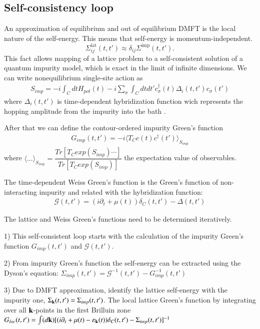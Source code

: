 \subsection{Self-consistency loop}
An approximation of equilibrium and out of equilibrium DMFT is the local nature of the self-energy. This means that self-energy is momentum-independent.
\begin{equation}
\Sigma_{ij}^\text{lat}(t,t')\approx \delta_{ij}\Sigma^\text{imp}(t,t').
\end{equation}
This fact allows mapping of a lattice problem to a self-consistent solution of a quantum impurity model, which is exact in the limit of infinite dimensions. 
We can write nonequilibrium single-site action as
\begin{align}
\label{Action}
S_{imp}=-i\int_C dt H_{pot}(t)-i\sum_{\sigma}{\int_C dt dt' c^{\dagger}_{\sigma}(t) \Delta_i (t,t') c_{\sigma}(t')}
\end{align}
where $\Delta_i (t,t')$ is time-dependent hybridization function wich represents the hopping amplitude from the impurity into the bath \citep{PhysRevB.45.6479}.

After that we can define the contour-ordered impurity Green’s function
\begin{align}
\label{Green_imp}
G_{imp}(t,t')=-i\langle T_C c(t) c^{\dagger}(t') \rangle_{S_{imp}}
\end{align}
where $\langle...\rangle_{S_{imp}}=\dfrac{Tr\left[T_C exp (S_{imp})\cdots\right] }{Tr \left[T_C exp (S_{imp})\right]}$ the expectation value of observables.

The time-dependent Weiss Green's function is the Green's function of non-interacting impurity and related with the hybridization function:
\begin{align}
\label{Green_Weiss}
\mathcal{G}(t,t')=(i\partial_t+\mu(t))\delta_C(t,t')-\Delta(t,t')
\end{align}

The lattice and Weiss Green's functions need to be determined iteratively.

 
1) This self-consistent loop starts with the calculation of the impurity Green's function $G_{imp}(t,t')$ and $\mathcal{G}(t,t')$.

2) From impurity Green's function the self-energy can be extracted using the Dyson's equation: $\Sigma_{imp}(t,t')=\mathcal{G}^{-1}(t,t')-G_{imp}^{-1}(t,t')$

3) Due to DMFT approximation, identify the lattice self-energy with the impurity one, $\Sigma_{\bf k}(t,t')=\Sigma_{imp}(t,t')$. The local lattice Green’s function by integrating over all ${\bf k}$-points in the first Brilluin zone $G_{loc}(t,t')=\int(d {\bf k})[(i\partial_t+\mu(t)-\varepsilon_{\bf k}(t))\delta_C(t,t')-\Sigma_{imp}(t,t')]^{-1}$

